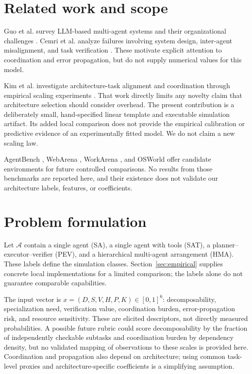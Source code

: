 \documentclass[11pt]{article}
\begin{document}
\section{Related work and scope}
Guo et al. survey LLM-based multi-agent systems and their organizational challenges \cite{guo2024multiagent}. Cemri et al. analyze failures involving system design, inter-agent misalignment, and task verification \cite{cemri2025failures}. These motivate explicit attention to coordination and error propagation, but do not supply numerical values for this model.

Kim et al. investigate architecture-task alignment and coordination through empirical scaling experiments \cite{kim2026scaling}. That work directly limits any novelty claim that architecture selection should consider overhead. The present contribution is a deliberately small, hand-specified linear template and executable simulation artifact. Its added local comparison does not provide the empirical calibration or predictive evidence of an experimentally fitted model. We do not claim a new scaling law.

AgentBench \cite{liu2024agentbench}, WebArena \cite{zhou2024webarena}, WorkArena \cite{drouin2024workarena}, and OSWorld \cite{xie2024osworld} offer candidate environments for future controlled comparisons. No results from those benchmarks are reported here, and their existence does not validate our architecture labels, features, or coefficients.

\section{Problem formulation}
Let $\mathcal A$ contain a single agent (SA), a single agent with tools (SAT), a planner--executor--verifier (PEV), and a hierarchical multi-agent arrangement (HMA). These labels define the simulation classes. Section~\ref{sec:empirical} supplies concrete local implementations for a limited comparison; the labels alone do not guarantee comparable capabilities.

The input vector is $x=(D,S,V,H,P,K)\in[0,1]^6$: decomposability, specialization need, verification value, coordination burden, error-propagation risk, and resource sensitivity. These are elicited descriptors, not directly measured probabilities. A possible future rubric could score decomposability by the fraction of independently checkable subtasks and coordination burden by dependency density, but no validated mapping of observations to these scales is provided here. Coordination and propagation also depend on architecture; using common task-level proxies and architecture-specific coefficients is a simplifying assumption.
\end{document}
